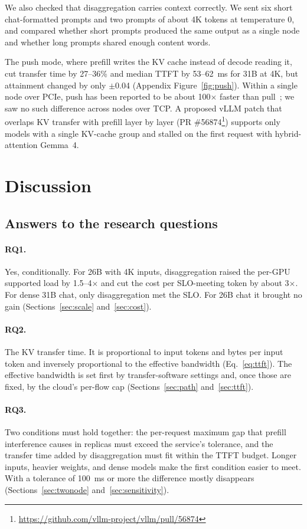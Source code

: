 \documentclass[11pt]{article}
\begin{document}
We also checked that disaggregation carries context correctly. We sent six short chat-formatted prompts and two prompts of about 4K tokens at temperature 0, and compared whether short prompts produced the same output as a single node and whether long prompts shared enough content words.

The push mode, where prefill writes the KV cache instead of decode reading it, cut transfer time by 27--36\% and median TTFT by 53--62~ms for 31B at 4K, but attainment changed by only $\pm$0.04 (Appendix Figure~\ref{fig:push}). Within a single node over PCIe, push has been reported to be about 100$\times$ faster than pull~\cite{vllm52607}; we saw no such difference across nodes over TCP. A proposed vLLM patch that overlaps KV transfer with prefill layer by layer (PR \#56874\footnote{\url{https://github.com/vllm-project/vllm/pull/56874}}) supports only models with a single KV-cache group and stalled on the first request with hybrid-attention Gemma~4.

\section{Discussion}

\subsection{Answers to the research questions}

\paragraph{RQ1.} Yes, conditionally. For 26B with 4K inputs, disaggregation raised the per-GPU supported load by 1.5--4$\times$ and cut the cost per SLO-meeting token by about 3$\times$. For dense 31B chat, only disaggregation met the SLO. For 26B chat it brought no gain (Sections~\ref{sec:scale} and~\ref{sec:cost}).

\paragraph{RQ2.} The KV transfer time. It is proportional to input tokens and bytes per input token and inversely proportional to the effective bandwidth (Eq.~\eqref{eq:ttft}). The effective bandwidth is set first by transfer-software settings and, once those are fixed, by the cloud's per-flow cap (Sections~\ref{sec:path} and~\ref{sec:ttft}).

\paragraph{RQ3.} Two conditions must hold together: the per-request maximum gap that prefill interference causes in replicas must exceed the service's tolerance, and the transfer time added by disaggregation must fit within the TTFT budget. Longer inputs, heavier weights, and dense models make the first condition easier to meet. With a tolerance of 100~ms or more the difference mostly disappears (Sections~\ref{sec:twonode} and~\ref{sec:sensitivity}).
\end{document}
